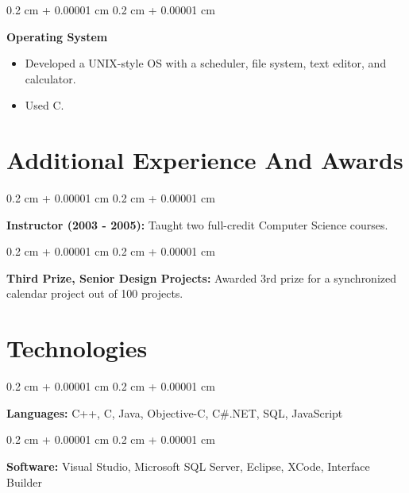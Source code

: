 \documentclass[10pt, letterpaper]{article}
\newenvironment{highlights}{
    \begin{itemize}[
        topsep=0.10 cm,
        parsep=0.10 cm,
        partopsep=0pt,
        itemsep=0pt,
        leftmargin=0.4 cm + 10pt
    ]
}{
    \end{itemize}
} %
\newenvironment{onecolentry}{
    \begin{adjustwidth}{
        0.2 cm + 0.00001 cm
    }{
        0.2 cm + 0.00001 cm
    }
}{
    \end{adjustwidth}
} %
\newenvironment{twocolentry}[2][]{
    \onecolentry
    \def\secondColumn{#2}
    \setcolumnwidth{\fill, 4.5 cm}
    \begin{paracol}{2}
}{
    \switchcolumn \raggedleft \secondColumn
    \end{paracol}
    \endonecolentry
} %
\begin{document}
        \vspace{0.2 cm}

        \begin{twocolentry}{
            2002
        }
            \textbf{Operating System}
            \begin{highlights}
                \item Developed a UNIX-style OS with a scheduler, file system, text editor, and calculator.
                \item Used C.
            \end{highlights}
        \end{twocolentry}



    
    \section{Additional Experience And Awards}



        
        \begin{onecolentry}
            \textbf{Instructor (2003 - 2005):} Taught two full-credit Computer Science courses.
        \end{onecolentry}

        \vspace{0.2 cm}

        \begin{onecolentry}
            \textbf{Third Prize, Senior Design Projects:} Awarded 3rd prize for a synchronized calendar project out of 100 projects.
        \end{onecolentry}


    
    \section{Technologies}



        
        \begin{onecolentry}
            \textbf{Languages:} C++, C, Java, Objective-C, C\#.NET, SQL, JavaScript
        \end{onecolentry}

        \vspace{0.2 cm}

        \begin{onecolentry}
            \textbf{Software:} Visual Studio, Microsoft SQL Server, Eclipse, XCode, Interface Builder
        \end{onecolentry}


    
\end{document}

